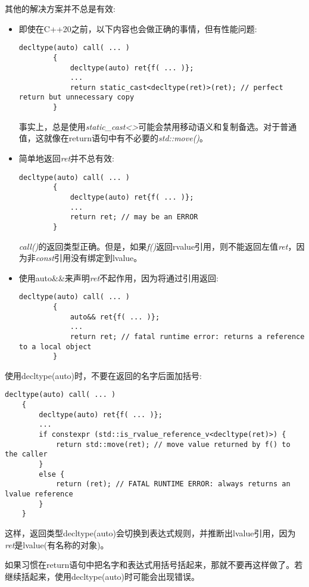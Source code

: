 其他的解决方案并不总是有效:\par

\begin{itemize}
	\item 即使在C++20之前，以下内容也会做正确的事情，但有性能问题:\par
	\begin{lstlisting}[caption={}]
		decltype(auto) call( ... )
		{
			decltype(auto) ret{f( ... )};
			...
			return static_cast<decltype(ret)>(ret); // perfect return but unnecessary copy
		}
	\end{lstlisting}
	事实上，总是使用\textit{static\_cast<>}可能会禁用移动语义和复制备选。对于普通值，这就像在return语句中有不必要的\textit{std::move()}。
	\item 简单地返回\textit{ret}并不总有效:
	\begin{lstlisting}[caption={}]
		decltype(auto) call( ... )
		{
			decltype(auto) ret{f( ... )};
			...
			return ret; // may be an ERROR
		}
	\end{lstlisting}
	\textit{call()}的返回类型正确。但是，如果\textit{f()}返回rvalue引用，则不能返回左值\textit{ret}，因为非\textit{const}引用没有绑定到lvalue。
	\item 使用auto\&\&来声明\textit{ret}不起作用，因为将通过引用返回:
	\begin{lstlisting}[caption={}]
		decltype(auto) call( ... )
		{
			auto&& ret{f( ... )};
			...
			return ret; // fatal runtime error: returns a reference to a local object
		}
	\end{lstlisting}
\end{itemize}

使用decltype(auto)时，不要在返回的名字后面加括号:\par

\begin{lstlisting}[caption={}]
	decltype(auto) call( ... )
	{
		decltype(auto) ret{f( ... )};
		...
		if constexpr (std::is_rvalue_reference_v<decltype(ret)>) {
			return std::move(ret); // move value returned by f() to the caller
		}
		else {
			return (ret); // FATAL RUNTIME ERROR: always returns an lvalue reference
		}
	}
\end{lstlisting}

这样，返回类型decltype(auto)会切换到表达式规则，并推断出lvalue引用，因为\textit{ret}是lvalue(有名称的对象)。\par

如果习惯在return语句中把名字和表达式用括号括起来，那就不要再这样做了。若继续括起来，使用decltype(auto)时可能会出现错误。\par

